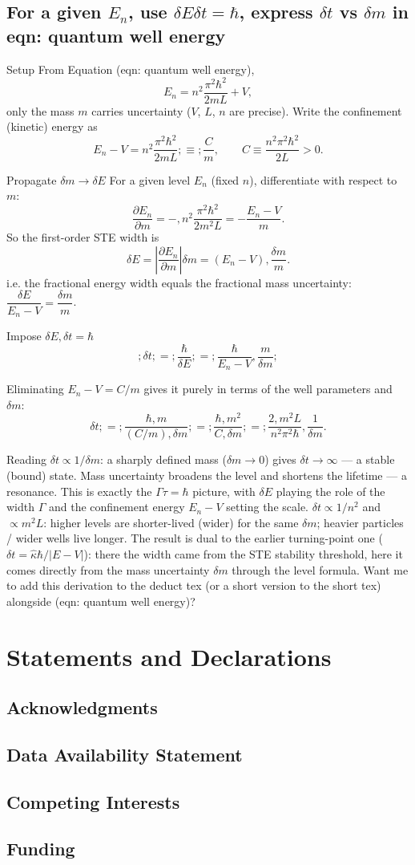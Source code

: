 \documentclass[twoside]{article}
\numberwithin{equation}{section}
\begin{document}
\subsection{For a given $E_n$, use $\delta E \delta t = \hbar$, express $\delta t$ vs $\delta m$ in {eqn: quantum well energy}}

Setup
From Equation (eqn: quantum well energy),
$$E_n = n^2\frac{\pi^2\hbar^2}{2mL} + V,$$
only the mass $m$ carries uncertainty ($V$, $L$, $n$ are precise). Write the confinement (kinetic) energy as
$$E_n - V = n^2\frac{\pi^2\hbar^2}{2mL} ;\equiv; \frac{C}{m},\qquad C \equiv \frac{n^2\pi^2\hbar^2}{2L}>0 .$$

Propagate $\delta m \to \delta E$
For a given level $E_n$ (fixed $n$), differentiate with respect to $m$:
$$\frac{\partial E_n}{\partial m} = -,n^2\frac{\pi^2\hbar^2}{2m^2L} = -\frac{E_n-V}{m}.$$
So the first-order STE width is
$$\delta E = \left|\frac{\partial E_n}{\partial m}\right|\delta m = (E_n-V),\frac{\delta m}{m}.$$
i.e. the fractional energy width equals the fractional mass uncertainty: $\dfrac{\delta E}{E_n-V}=\dfrac{\delta m}{m}$.

Impose $\delta E,\delta t=\hbar$
$$\boxed{;\delta t ;=; \frac{\hbar}{\delta E} ;=; \frac{\hbar}{E_n-V},\frac{m}{\delta m};}$$

Eliminating $E_n-V=C/m$ gives it purely in terms of the well parameters and $\delta m$:
$$\delta t ;=; \frac{\hbar,m}{(C/m),\delta m} ;=; \frac{\hbar,m^2}{C,\delta m} ;=; \frac{2,m^2 L}{n^2\pi^2\hbar},\frac{1}{\delta m}.$$

Reading
$\delta t \propto 1/\delta m$: a sharply defined mass ($\delta m\to0$) gives $\delta t\to\infty$ — a stable (bound) state. Mass uncertainty broadens the level and shortens the lifetime — a resonance. This is exactly the $\Gamma\tau=\hbar$ picture, with $\delta E$ playing the role of the width $\Gamma$ and the confinement energy $E_n-V$ setting the scale.
$\delta t \propto 1/n^2$ and $\propto m^2 L$: higher levels are shorter-lived (wider) for the same $\delta m$; heavier particles / wider wells live longer.
The result is dual to the earlier turning-point one ($\delta t = \hat\kappa\hbar/|E-V|$): there the width came from the STE stability threshold, here it comes directly from the mass uncertainty $\delta m$ through the level formula.
Want me to add this derivation to the deduct tex (or a short version to the short tex) alongside (eqn: quantum well energy)?

\section{Statements and Declarations}

\subsection{Acknowledgments}

\subsection{Data  Availability Statement}

\subsection{Competing Interests}

\subsection{Funding}
\end{document}
